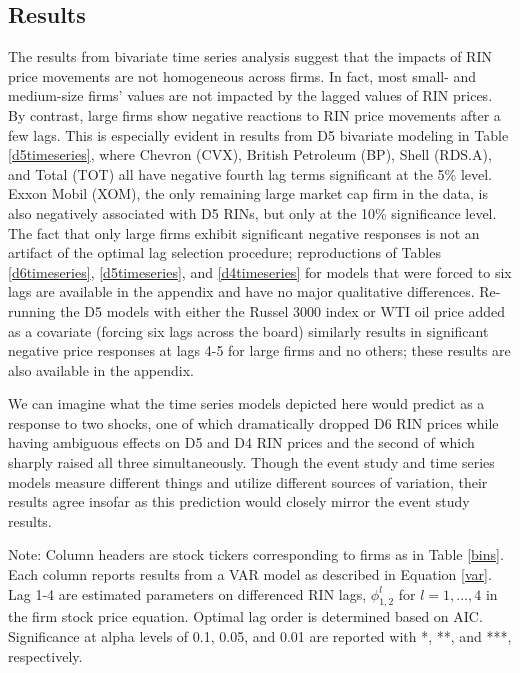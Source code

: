 \documentclass[11pt]{article}
\begin{document}
\subsection{Results}

The results from bivariate time series analysis suggest that the impacts of RIN price movements are not homogeneous across firms. In fact, most small- and medium-size firms' values are not impacted by the lagged values of RIN prices. By contrast, large firms show negative reactions to RIN price movements after a few lags. This is especially evident in results from D5 bivariate modeling in Table \ref{d5timeseries}, where Chevron (CVX), British Petroleum (BP), Shell (RDS.A), and Total (TOT) all have negative fourth lag terms significant at the 5\% level. Exxon Mobil (XOM), the only remaining large market cap firm in the data, is also negatively associated with D5 RINs, but only at the 10\% significance level. The fact that only large firms exhibit significant negative responses is not an artifact of the optimal lag selection procedure; reproductions of Tables \ref{d6timeseries}, \ref{d5timeseries}, and \ref{d4timeseries} for models that were forced to six lags are available in the appendix and have no major qualitative differences. Re-running the D5 models with either the Russel 3000 index or WTI oil price added as a covariate (forcing six lags across the board) similarly results in significant negative price responses at lags 4-5 for large firms and no others; these results are also available in the appendix.

We can imagine what the time series models depicted here would predict as a response to two shocks, one of which dramatically dropped D6 RIN prices while having ambiguous effects on D5 and D4 RIN prices and the second of which sharply raised all three simultaneously. Though the event study and time series models measure different things and utilize different sources of variation, their results agree insofar as this prediction would closely mirror the event study results.


\begin{table}[!ht] \centering 
	\caption{Bivariate Time Series Model with D6 RINs} 
	\label{d6timeseries} 
	\begin{flushleft}
		\scriptsize{Note: Column headers are stock tickers corresponding to firms as in Table \ref{bins}. Each column reports results from a VAR model as described in Equation \ref{var}. Lag 1-4 are estimated parameters on differenced RIN lags, $\phi_{1,2}^l$ for $l=1,\dots,4$ in the firm stock price equation. Optimal lag order is determined based on AIC. Significance at alpha levels of 0.1, 0.05, and 0.01 are reported with *, **, and ***, respectively.}\\
	\end{flushleft}
\end{table} 
\end{document}

